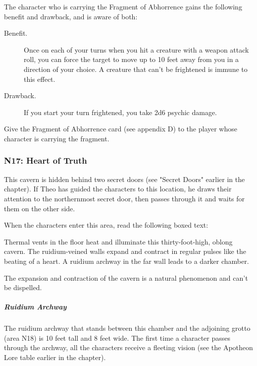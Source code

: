 \documentclass[10pt,a4paper,twoside,fancy,bg=print,twocolumn,openany,nodeprecatedcode]{dndbook}
\begin{document}
The character who is carrying the Fragment of Abhorrence gains the following benefit and drawback, and is aware of both:

\begin{DndSidebar}[float=!b]{}

\begin{description}
\item[Benefit.]
Once on each of your turns when you hit a creature with a weapon attack roll, you can force the target to move up to 10 feet away from you in a direction of your choice. A creature that can't be frightened is immune to this effect.
\item[Drawback.]
If you start your turn frightened, you take 2d6 psychic damage.
\end{description}



\end{DndSidebar}

Give the Fragment of Abhorrence card (see appendix D) to the player whose character is carrying the fragment.

\subsubsection{N17: Heart of Truth}
This cavern is hidden behind two secret doors (see "Secret Doors" earlier in the chapter). If Theo has guided the characters to this location, he draws their attention to the northernmost secret door, then passes through it and waits for them on the other side.

When the characters enter this area, read the following boxed text:

\begin{DndReadAloud}{}
Thermal vents in the floor heat and illuminate this thirty-foot-high, oblong cavern. The ruidium-veined walls expand and contract in regular pulses like the beating of a heart. A ruidium archway in the far wall leads to a darker chamber.

\end{DndReadAloud}

The expansion and contraction of the cavern is a natural phenomenon and can't be dispelled.

\subparagraph{Ruidium Archway}
The ruidium archway that stands between this chamber and the adjoining grotto (area N18) is 10 feet tall and 8 feet wide. The first time a character passes through the archway, all the characters receive a fleeting vision (see the Apotheon Lore table earlier in the chapter).
\end{document}
